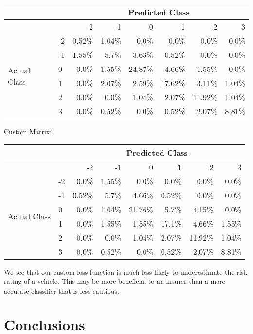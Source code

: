 \begin{tabular}{l l r r r r r r}
    \hline
                       &    & \multicolumn{6}{c}{Predicted Class}                   \\
    \hline
                       &    & -2      & -1    & 0       & 1       & 2       & 3     \\
    \hline
\multirow{6}{*}{Actual Class} & -2 & 0.52\% & 1.04\% & 0.0\% & 0.0\% & 0.0\% & 0.0\% \\
& -1 & 1.55\% & 5.7\% & 3.63\% & 0.52\% & 0.0\% & 0.0\% \\
& 0 & 0.0\% & 1.55\% & 24.87\% & 4.66\% & 1.55\% & 0.0\% \\
& 1 & 0.0\% & 2.07\% & 2.59\% & 17.62\% & 3.11\% & 1.04\% \\
& 2 & 0.0\% & 0.0\% & 1.04\% & 2.07\% & 11.92\% & 1.04\% \\
& 3 & 0.0\% & 0.52\% & 0.0\% & 0.52\% & 2.07\% & 8.81\% \\
\end{tabular}

Custom Matrix:

\begin{tabular}{l l r r r r r r}
    \hline
                       &    & \multicolumn{6}{c}{Predicted Class}                   \\
    \hline
                       &    & -2      & -1    & 0       & 1       & 2       & 3     \\
    \hline
\multirow{6}{*}{Actual Class} & -2 & 0.0\% & 1.55\% & 0.0\% & 0.0\% & 0.0\% & 0.0\% \\
& -1 & 0.52\% & 5.7\% & 4.66\% & 0.52\% & 0.0\% & 0.0\% \\
& 0 & 0.0\% & 1.04\% & 21.76\% & 5.7\% & 4.15\% & 0.0\% \\
& 1 & 0.0\% & 1.55\% & 1.55\% & 17.1\% & 4.66\% & 1.55\% \\
& 2 & 0.0\% & 0.0\% & 1.04\% & 2.07\% & 11.92\% & 1.04\% \\
& 3 & 0.0\% & 0.52\% & 0.0\% & 0.52\% & 2.07\% & 8.81\% \\
\end{tabular}

We see that our custom loss function is much less likely to underestimate the risk rating of a vehicle.
This may be more beneficial to an insurer than a more accurate classifier that is less cautious.

\section{Conclusions}

